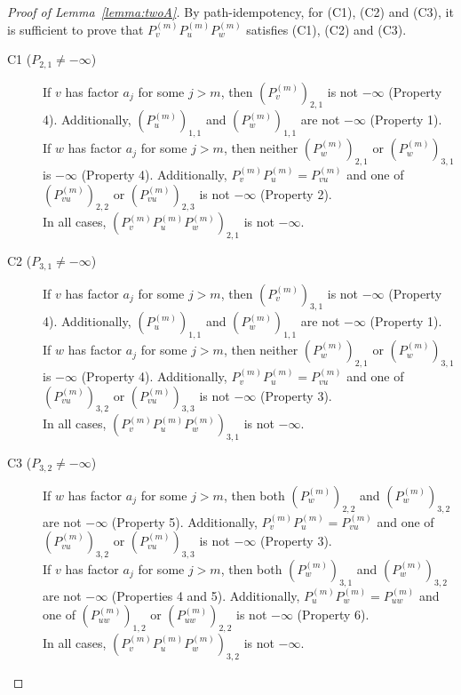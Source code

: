 \documentclass[10pt,a4paper]{amsart}
\theoremstyle{definition}
\numberwithin{equation}{section}
\theoremstyle{remark}
\theoremstyle{remark}
\begin{document}
    

\begin{proof}[Proof of Lemma~\ref{lemma:twoA}]
By path-idempotency, for (C1), (C2) and (C3), it is sufficient to prove that $P^{(m)}_v P^{(m)}_u P^{(m)}_w$ satisfies (C1), (C2) and (C3). 
\begin{description}
    
\item[C1 ($P_{2,1} \neq -\infty$)]  If $v$ has factor $a_j$ for some $j>m$, then $(P^{(m)}_v)_{2,1}$ is not $-\infty$ (Property 4). Additionally, $(P^{(m)}_u)_{1,1}$ and $(P^{(m)}_w)_{1,1}$ are not $-\infty$ (Property 1). \\
If $w$ has factor $a_j$ for some $j>m$, then neither $(P^{(m)}_w)_{2,1}$ or $(P^{(m)}_w)_{3,1}$ is $-\infty$ (Property 4). Additionally, $P^{(m)}_v P^{(m)}_u = P^{(m)}_{vu}$ and one of $(P^{(m)}_{vu})_{2,2}$ or $(P^{(m)}_{vu})_{2,3}$ is not $-\infty$ (Property 2). \\
In all cases, $(P^{(m)}_v P^{(m)}_u P^{(m)}_w)_{2,1}$ is not $-\infty$.

\item[C2 ($P_{3,1} \neq -\infty$)]  If $v$ has factor $a_j$ for some $j>m$, then $(P^{(m)}_v)_{3,1}$ is not $-\infty$ (Property 4). Additionally, $(P^{(m)}_u)_{1,1}$ and $(P^{(m)}_w)_{1,1}$ are not $-\infty$ (Property 1). \\
If $w$ has factor $a_j$ for some $j>m$, then neither $(P^{(m)}_w)_{2,1}$ or $(P^{(m)}_w)_{3,1}$ is $-\infty$ (Property 4). Additionally, $P^{(m)}_v P^{(m)}_u = P^{(m)}_{vu}$ and one of $(P^{(m)}_{vu})_{3,2}$ or $(P^{(m)}_{vu})_{3,3}$ is not $-\infty$ (Property 3).\\ 
In all cases, $(P^{(m)}_v P^{(m)}_u P^{(m)}_w)_{3,1}$ is not $-\infty$.

\item[C3 ($P_{3,2} \neq -\infty$)] If $w$ has factor $a_j$ for some $j>m$, then both $(P^{(m)}_w)_{2,2}$ and $(P^{(m)}_w)_{3,2}$ are not $-\infty$ (Property 5). Additionally, $P^{(m)}_v P^{(m)}_u = P^{(m)}_{vu}$ and one of $(P^{(m)}_{vu})_{3,2}$ or $(P^{(m)}_{vu})_{3,3}$ is not $-\infty$ (Property 3). \\
If $v$ has factor $a_j$ for some $j>m$, then both $(P^{(m)}_w)_{3,1}$ and $(P^{(m)}_w)_{3,2}$ are not $-\infty$ (Properties 4 and 5). Additionally, $P^{(m)}_u P^{(m)}_w = P^{(m)}_{uw}$ and one of $(P^{(m)}_{uw})_{1,2}$ or $(P^{(m)}_{uw})_{2,2}$ is not $-\infty$ (Property 6). \\
In all cases, $(P^{(m)}_v P^{(m)}_u P^{(m)}_w)_{3,2}$ is not $-\infty$.


\end{description}
\end{proof}
\end{document}
